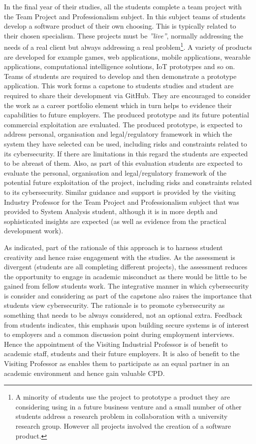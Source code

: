 \documentclass[conference]{IEEEtran}
\begin{document}
In the final year of their studies, all the students complete a team project with the Team Project and Professionalism subject. In this subject teams of students develop a software product of their own choosing. This is typically related to their chosen specialism. These projects must be {\em''live''}, normally addressing the needs of a real client but always addressing a real problem\footnote{A minority of students use the project to prototype a product they are considering using in a future business venture and a small number of other students address a research problem in collaboration with a university research group. However all projects involved the creation of a software product.}. A variety of products are developed for example games, web applications, mobile applications, wearable applications, computational intelligence solutions, IoT prototypes and so on. Teams of students are required to develop and then demonstrate a prototype application. This work forms a capstone to students studies and student are required to share their development via GitHub. They are encouraged to consider the work as a career portfolio element which in turn helps to evidence their capabilities to future employers. The produced prototype and its future potential commercial exploitation are evaluated. The produced prototype, is expected to address personal, organisation and legal/regulatory framework in which the system they have selected can be used, including risks and constraints related to its cybersecurity. If there are limitations in this regard the students are expected to be abreast of them. Also, as part of this evaluation students are expected to evaluate the personal, organisation and legal/regulatory framework of the potential future exploitation of the project, including risks and constraints related to its cybersecurity. Similar guidance and support is provided by the visiting Industry Professor for the Team Project and Professionalism subject that was provided to System Analysis student, although it is in more depth and  sophisticated insights are expected (as well as evidence from the practical development work).  

As indicated, part of the rationale of this approach is to harness student creativity and hence raise engagement with the studies. As the assessment is divergent {\cite{Bradley2016}} (students are all completing different projects), the assessment reduces the opportunity to engage in academic misconduct as there would be little to be gained from fellow students work. The integrative manner in which cybersecurity is consider and considering as part of the capstone also raises the importance that students view cybersecurity. The rationale is to promote cybersecurity as something that needs to be always considered, not an optional extra. Feedback from students indicates, this emphasis upon building secure systems is of interest to employers and a common discussion point during employment interviews. Hence the appointment of the Visiting Industrial Professor is of benefit to academic staff, students and their future employers. It is also of benefit to the Visiting Professor as enables them to participate as an equal partner in an academic environment and hence gain valuable CPD.
\end{document}
